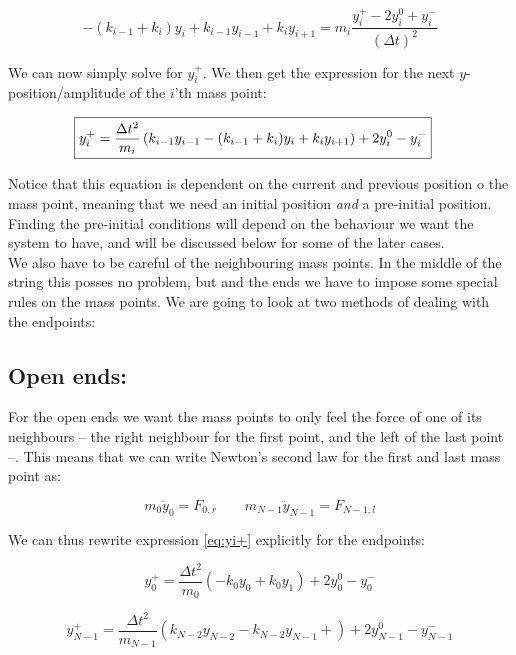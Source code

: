 \documentclass[a4paper,norsk, 10pt]{article}
\begin{document}
\begin{equation}
-(k_{i-1} + k_i)y_i + k_{i-1}y_{i-1} + k_iy_{i+1} = m_i\frac{y_i^+ -2y_i^0 + y_i^-}{(\Delta t)^2}
\end{equation}

We can now simply solve for $y_i^+$. We then get the expression for the next $y$-position/amplitude of the $i$'th mass point:

\begin{align}
\Aboxed{
y_i^+ = \frac{\Delta t^2}{m_i}\left(k_{i-1}y_{i-1} - (k_{i-1} +k_i)y_i + k_iy_{i+1}\right) + 2y_i^0 -y_i^-
}
\label{eq:yi+}
\end{align}

Notice that this equation is dependent on the current and previous position o the mass point, meaning that we need an initial position \textit{and} a pre-initial position. Finding the pre-initial conditions will depend on the behaviour we want the system to have, and will be discussed below for some of the later cases.\\

We also have to be careful of the neighbouring mass points. In the middle of the string this posses no problem, but and the ends we have to impose some special rules on the mass points. We are going to look at two methods of dealing with the endpoints:

\newpage

\subsection*{Open ends:}

For the open ends we want the mass points to only feel the force of one of its neighbours -- the right neighbour for the first point, and the left of the last point --. This means that we can write Newton's second law for the first and last mass point as:

\begin{equation}
m_0\ddot{y}_0 = F_{0,r} \qquad m_{N-1}\ddot{y}_{N-1} = F_{N-1,l}
\end{equation}

We can thus rewrite expression \eqref{eq:yi+} explicitly for the endpoints:

\begin{equation}
y_0^+ = \frac{\Delta t^2}{m_0}\left(-k_0y_0 + k_0y_{1}\right) + 2y_0^0 -y_0^-
\end{equation}

\begin{equation}
y_{N-1}^+ = \frac{\Delta t^2}{m_{N-1}}\left(k_{N-2}y_{N-2} - k_{N-2} y_{N-1} + \right) + 2y_{N-1}^0 -y_{N-1}^-
\end{equation}
\end{document}
